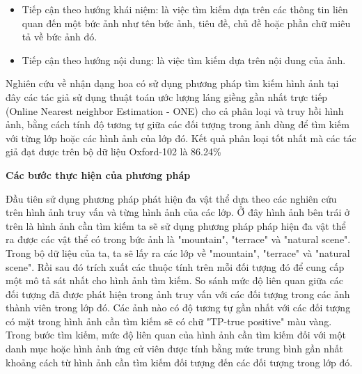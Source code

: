 \documentclass[12pt]{report}
\begin{document}
		\begin{itemize}
			\item Tiếp cận theo hướng khái niệm: là việc tìm kiếm dựa trên các thông tin liên quan đến một bức ảnh như tên bức ảnh, tiêu đề, chủ đề hoặc phần chữ miêu tả về bức ảnh đó.
			\item Tiếp cận theo hướng nội dung: là việc tìm kiếm dựa trên nội dung của ảnh.
		\end{itemize}
		Nghiên cứu về nhận dạng hoa có sử dụng phương pháp tìm kiếm hình ảnh \cite{cia-ONE} tại đây các tác giả sử dụng thuật toán ước lượng láng giềng gần nhất trực tiếp (Online Nearest neighbor Estimation - ONE) cho cả phân loại và truy hồi hình ảnh, bằng cách tính độ tương tự giữa các đối tượng trong ảnh dùng để tìm kiếm với từng lớp hoặc các hình ảnh của lớp đó. Kết quả phân loại tốt nhất mà các tác giả đạt được trên bộ dữ liệu Oxford-102 \cite{cia-Nilsback06} là 86.24\%
				
				
																						
		\textbf{Các bước thực hiện của phương pháp}
		
																						
		Đầu tiên sử dụng phương pháp phát hiện đa vật thể dựa theo các nghiên cứu \cite{cia_object_propo_1} \cite{cia_object_propo_2} \cite{cia_object_propo_3} trên hình ảnh truy vấn và từng hình ảnh của các lớp. Ở đây hình ảnh bên trái ở trên là hình ảnh cần tìm kiếm ta sẽ sử dụng phương pháp pháp hiện đa vật thể ra được các vật thể có trong bức ảnh là "mountain", "terrace" và "natural scene".																				
		Trong bộ dữ liệu của ta, ta sẽ lấy ra các lớp về "mountain", "terrace" và "natural scene". Rồi sau đó trích xuất các thuộc tính trên mỗi đối tượng đó để cung cấp một mô tả sát nhất cho hình ảnh tìm kiếm. 
		So sánh mức độ liên quan giữa các đối tượng đã được phát hiện trong ảnh truy vấn với các đối tượng trong các ảnh thành viên trong lớp đó. Các ảnh nào có độ tương tự gần nhất với các đối tượng có mặt trong hình ảnh cần tìm kiếm sẽ có chữ "TP-true positive" màu vàng.
		Trong bước tìm kiếm, mức độ liên quan của hình ảnh cần tìm kiếm đối với một danh mục hoặc hình ảnh ứng cử viên được tính bằng mức trung bình gần nhất khoảng cách từ hình ảnh cần tìm kiếm đối tượng đến các đối tượng trong lớp đó.
		
\end{document}

